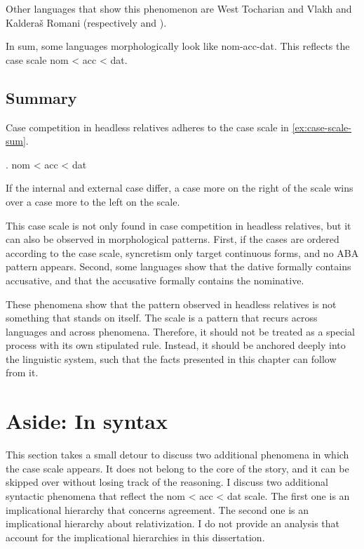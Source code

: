 Other languages that show this phenomenon are West Tocharian \citep{gippert1987} and Vlakh and Kalderaš Romani (respectively \citealt{friedman1991} and \citealt{boretzky1994}).

In sum, some languages morphologically look like \ac{nom}-\ac{acc}-\ac{dat}. This reflects the case scale \ac{nom} < \ac{acc} < \ac{dat}.



\subsection{Summary}

Case competition in headless relatives adheres to the case scale in \ref{ex:case-scale-sum}.

\ex. \ac{nom} < \ac{acc} < \ac{dat}\label{ex:case-scale-sum}

If the internal and external case differ, a case more on the right of the scale wins over a case more to the left on the scale.

This case scale is not only found in case competition in headless relatives, but it can also be observed in morphological patterns. First, if the cases are ordered according to the case scale, syncretism only target continuous forms, and no ABA pattern appears. Second, some languages show that the dative formally contains accusative, and that the accusative formally contains the nominative.

These phenomena show that the pattern observed in headless relatives is not something that stands on itself. The scale is a pattern that recurs across languages and across phenomena. Therefore, it should not be treated as a special process with its own stipulated rule. Instead, it should be anchored deeply into the linguistic system, such that the facts presented in this chapter can follow from it.




\section{Aside: In syntax}\label{sec:impl-hier}

This section takes a small detour to discuss two additional phenomena in which the case scale appears. It does not belong to the core of the story, and it can be skipped over without losing track of the reasoning. I discuss two additional syntactic phenomena that reflect the \ac{nom} < \ac{acc} < \ac{dat} scale. The first one is an implicational hierarchy that concerns agreement. The second one is an implicational hierarchy about relativization. I do not provide an analysis that account for the implicational hierarchies in this dissertation.

